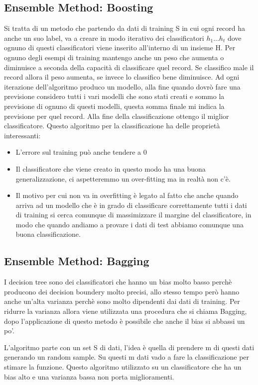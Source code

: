 \documentclass[14pt]{extreport}
\begin{document}
\subsection{Ensemble Method: Boosting}

Si tratta di un metodo che partendo da dati di training S in cui ogni record ha anche un suo label, va a creare in modo iterativo dei classificatori $h_1$...$h_t$ dove ognuno di questi classificatori viene inserito all'interno di un insieme H.
Per ognuno degli esempi di training mantengo anche un peso che aumenta o diminuisce a seconda della capacità di classificare quel record. Se classifico male il record allora il peso aumenta, se invece lo classifico bene diminuisce.
Ad ogni iterazione dell'algoritmo produco un modello, alla fine quando dovrò fare una previsione considero tutti i vari modelli che sono stati creati e sommo la previsione di ognuno di questi modelli, questa somma finale mi indica la previsione per quel record.
Alla fine della classificazione ottengo il miglior classificatore.
Questo algoritmo per la classificazione ha delle proprietà interessanti:
\begin{itemize}
    \item L'errore sul training può anche tendere a 0
    \item Il classificatore che viene creato in questo modo ha una buona generalizzazione, ci aspetteremmo un over-fitting ma in realtà non c'è.
    \item Il motivo per cui non va in overfitting è legato al fatto che anche quando arriva ad un modello che è in grado di classificare correttamente tutti i dati di training si cerca comunque di massimizzare il margine del classificatore, in modo che quando andiamo a provare i dati di test abbiamo comunque una buona classificazione. 
\end{itemize}

\subsection{Ensemble Method: Bagging}

I decision tree sono dei classificatori che hanno un bias molto basso perchè producono dei decision boundery molto precisi, allo stesso tempo però hanno anche un'alta varianza perchè sono molto dipendenti dai dati di training.
Per ridurre la varianza allora viene utilizzata una procedura che si chiama Bagging, dopo l'applicazione di questo metodo è possibile che anche il bias si abbassi un po'.

L'algoritmo parte con un set S di dati, l'idea è quella di prendere m di questi dati generando un random sample. 
Su questi m dati vado a fare la classificazione per stimare la funzione.
Questo algoritmo utilizzato su un classificatore che ha un bias alto e una varianza bassa non porta miglioramenti.
\end{document}
